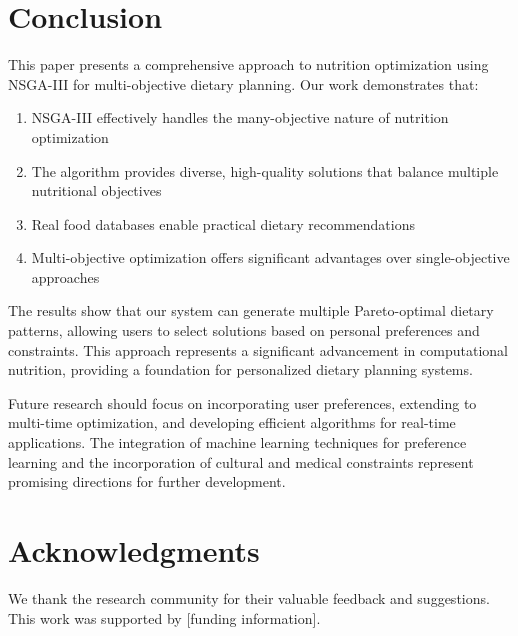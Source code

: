 \documentclass[12pt,a4paper]{article}
\begin{document}
\section{Conclusion}

This paper presents a comprehensive approach to nutrition optimization using NSGA-III for multi-objective dietary planning. Our work demonstrates that:

\begin{enumerate}
    \item NSGA-III effectively handles the many-objective nature of nutrition optimization
    \item The algorithm provides diverse, high-quality solutions that balance multiple nutritional objectives
    \item Real food databases enable practical dietary recommendations
    \item Multi-objective optimization offers significant advantages over single-objective approaches
\end{enumerate}

The results show that our system can generate multiple Pareto-optimal dietary patterns, allowing users to select solutions based on personal preferences and constraints. This approach represents a significant advancement in computational nutrition, providing a foundation for personalized dietary planning systems.

Future research should focus on incorporating user preferences, extending to multi-time optimization, and developing efficient algorithms for real-time applications. The integration of machine learning techniques for preference learning and the incorporation of cultural and medical constraints represent promising directions for further development.

\section*{Acknowledgments}

We thank the research community for their valuable feedback and suggestions. This work was supported by [funding information].
\end{document}
